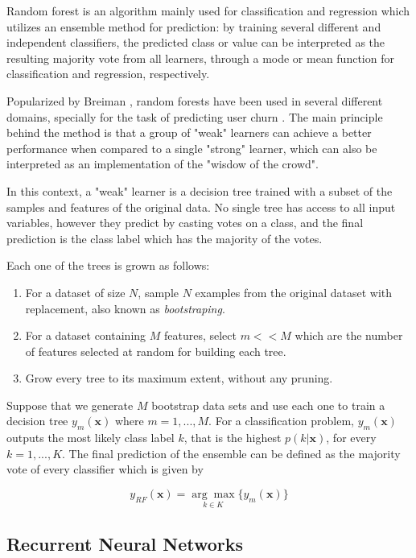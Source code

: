 \documentclass{kththesis}
\begin{document}
Random forest is an algorithm mainly used for classification and regression which utilizes an ensemble method for prediction: by training several different and independent classifiers, the predicted class or value can be interpreted as the resulting majority vote from all learners, through a mode or mean function for classification and regression, respectively.

Popularized by Breiman \citep{breiman2001random}, random forests have been used in several different domains, specially for the task of predicting user churn \citep{coussement2013customer} \citep{burez2008separating}. The main principle behind the method is that a group of "weak" learners can achieve a better performance when compared to a single "strong" learner, which can also be interpreted as an implementation of the "wisdow of the crowd". 

In this context, a "weak" learner is a decision tree trained with a subset of the samples and features of the original data. No single tree has access to all input variables, however they predict by casting votes on a class, and the final prediction is the class label which has the majority of the votes.

Each one of the trees is grown as follows:

\begin{enumerate}
\item For a dataset of size $N$, sample $N$ examples from the original dataset with replacement, also known as \emph{bootstraping}.
\item For a dataset containing $M$ features, select $m<<M$ which are the number of features selected at random for building each tree.
\item Grow every tree to its maximum extent, without any pruning.
\end{enumerate}

Suppose that we generate $M$ bootstrap data sets and use each one to train a decision tree $y_m(\mathbf{x})$ where $m=1,...,M$. For a classification problem, $y_m(\mathbf{x})$ outputs the most likely class label $k$, that is the highest $p(k|\mathbf{x})$, for every $k=1,...,K$. The final prediction of the ensemble can be defined as the majority vote of every classifier which is given by

\begin{equation}
y_\textit{RF}(\mathbf{x}) = \underset{k \in K}{\arg\max} \{y_m(\mathbf{x})\}
\end{equation}

\subsection{Recurrent Neural Networks}
\end{document}
